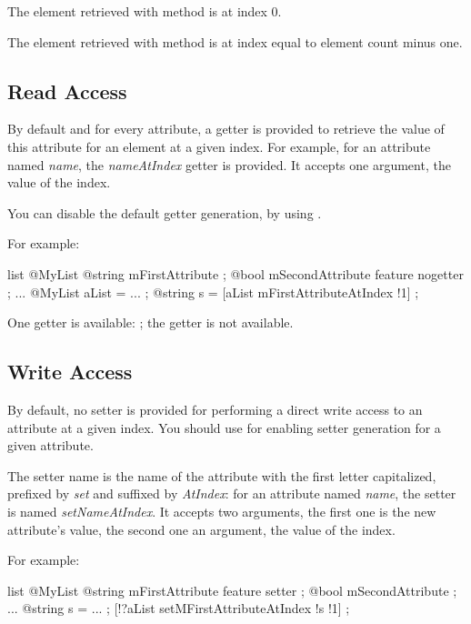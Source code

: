 The element retrieved with  method is at index 0.

The element retrieved with  method is at index equal to element count minus one.

\subsection{Read Access}

By default and for every attribute, a getter is provided to retrieve the value of this attribute for an element at a given index. For example, for an attribute named \emph{name}, the \emph{nameAtIndex} getter is provided. It accepts one  argument, the value of the index.

You can disable the default getter generation, by using .

For example:
\begin{galgascode}
list @MyList {
  @string mFirstAttribute ;
  @bool mSecondAttribute feature nogetter ;
}
...
@MyList aList = ... ;
@string s = [aList mFirstAttributeAtIndex !1] ;
\end{galgascode}

One getter is available: ; the  getter is not available.


\subsection{Write Access}

By default, no setter is provided for performing a direct write access to an attribute at a given index. You should use  for enabling setter generation for a given attribute.

The setter name is the name of the attribute with the first letter capitalized, prefixed by \emph{set} and suffixed by \emph{AtIndex}: for an attribute named \emph{name}, the setter is named \emph{setNameAtIndex}. It accepts two arguments, the first one is the new attribute's value, the second one an  argument, the value of the index.

For example:

\begin{galgascode}
list @MyList {
  @string mFirstAttribute feature setter ;
  @bool mSecondAttribute ;
}
...
@string s = ... ;
[!?aList setMFirstAttributeAtIndex !s !1] ;
\end{galgascode}

